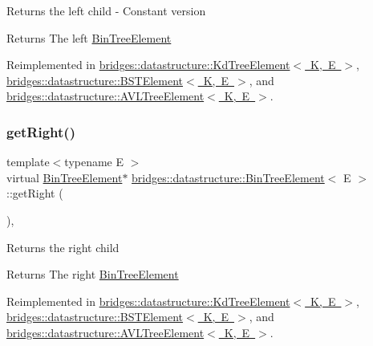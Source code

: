 Returns the left child -\/ Constant version \begin{DoxyReturn}{Returns}
The left \mbox{\hyperlink{classbridges_1_1datastructure_1_1_bin_tree_element}{Bin\+Tree\+Element}} 
\end{DoxyReturn}


Reimplemented in \mbox{\hyperlink{classbridges_1_1datastructure_1_1_kd_tree_element_a653597918fbc6e31b84fcf8dbdf67122}{bridges\+::datastructure\+::\+Kd\+Tree\+Element$<$ K, E $>$}}, \mbox{\hyperlink{classbridges_1_1datastructure_1_1_b_s_t_element_abac324ef0b480420bd82ecfe4501d60d}{bridges\+::datastructure\+::\+B\+S\+T\+Element$<$ K, E $>$}}, and \mbox{\hyperlink{classbridges_1_1datastructure_1_1_a_v_l_tree_element_a4a639e0c623435aadf5c51ed132cb25d}{bridges\+::datastructure\+::\+A\+V\+L\+Tree\+Element$<$ K, E $>$}}.

\mbox{\label{classbridges_1_1datastructure_1_1_bin_tree_element_ae1e6bde8cc03cf5da5a7930354fdf592}} 
\subsubsection{\texorpdfstring{get\+Right()}{getRight()}\hspace{0.1cm}{\footnotesize\ttfamily [1/2]}}
{\footnotesize\ttfamily template$<$typename E $>$ \\
virtual \mbox{\hyperlink{classbridges_1_1datastructure_1_1_bin_tree_element}{Bin\+Tree\+Element}}$\ast$ \mbox{\hyperlink{classbridges_1_1datastructure_1_1_bin_tree_element}{bridges\+::datastructure\+::\+Bin\+Tree\+Element}}$<$ E $>$\+::get\+Right (\begin{DoxyParamCaption}{ }\end{DoxyParamCaption})\hspace{0.3cm}{\ttfamily [inline]}, {\ttfamily [virtual]}}

Returns the right child \begin{DoxyReturn}{Returns}
The right \mbox{\hyperlink{classbridges_1_1datastructure_1_1_bin_tree_element}{Bin\+Tree\+Element}} 
\end{DoxyReturn}


Reimplemented in \mbox{\hyperlink{classbridges_1_1datastructure_1_1_kd_tree_element_a366e3b0987169220d3a145043be2373d}{bridges\+::datastructure\+::\+Kd\+Tree\+Element$<$ K, E $>$}}, \mbox{\hyperlink{classbridges_1_1datastructure_1_1_b_s_t_element_a80f5085d6d03805dd3091b7693d8e235}{bridges\+::datastructure\+::\+B\+S\+T\+Element$<$ K, E $>$}}, and \mbox{\hyperlink{classbridges_1_1datastructure_1_1_a_v_l_tree_element_aed585fdf56fcbfebac6cd0262c9c1807}{bridges\+::datastructure\+::\+A\+V\+L\+Tree\+Element$<$ K, E $>$}}.

